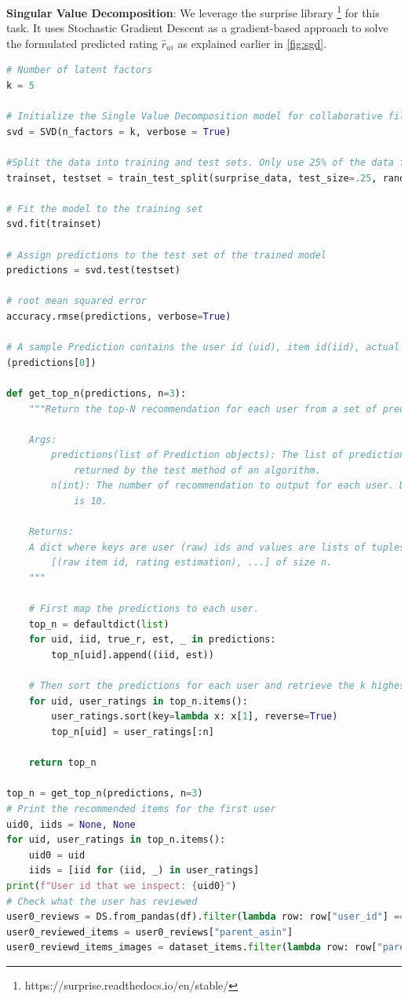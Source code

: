 \documentclass{article}
\begin{document}
\textbf{Singular Value Decomposition}: We leverage the surprise library \footnote{https://surprise.readthedocs.io/en/stable/} for this task. It uses Stochastic Gradient Descent as a gradient-based approach to solve the formulated predicted rating $\hat{r}_{ui}$ as explained earlier in \ref{fig:sgd}.
\begin{lstlisting}[language=Python]
# Number of latent factors
k = 5

# Initialize the Single Value Decomposition model for collaborative filtering
svd = SVD(n_factors = k, verbose = True)

#Split the data into training and test sets. Only use 25% of the data for speed.
trainset, testset = train_test_split(surprise_data, test_size=.25, random_state=random_state)

# Fit the model to the training set
svd.fit(trainset)

# Assign predictions to the test set of the trained model
predictions = svd.test(testset)

# root mean squared error
accuracy.rmse(predictions, verbose=True)

# A sample Prediction contains the user id (uid), item id(iid), actual rating (r_ui), estimated rating (est), and additional details (details).
(predictions[0])

def get_top_n(predictions, n=3):
    """Return the top-N recommendation for each user from a set of predictions.

    Args:
        predictions(list of Prediction objects): The list of predictions, as
            returned by the test method of an algorithm.
        n(int): The number of recommendation to output for each user. Default
            is 10.

    Returns:
    A dict where keys are user (raw) ids and values are lists of tuples:
        [(raw item id, rating estimation), ...] of size n.
    """

    # First map the predictions to each user.
    top_n = defaultdict(list)
    for uid, iid, true_r, est, _ in predictions:
        top_n[uid].append((iid, est))

    # Then sort the predictions for each user and retrieve the k highest ones.
    for uid, user_ratings in top_n.items():
        user_ratings.sort(key=lambda x: x[1], reverse=True)
        top_n[uid] = user_ratings[:n]

    return top_n

top_n = get_top_n(predictions, n=3)
# Print the recommended items for the first user
uid0, iids = None, None
for uid, user_ratings in top_n.items():
    uid0 = uid
    iids = [iid for (iid, _) in user_ratings]
print(f"User id that we inspect: {uid0}")
# Check what the user has reviewed
user0_reviews = DS.from_pandas(df).filter(lambda row: row["user_id"] == uid0)
user0_reviewed_items = user0_reviews["parent_asin"]
user0_reviewd_items_images = dataset_items.filter(lambda row: row["parent_asin"] in user0_reviewed_items)


\end{lstlisting}
\end{document}
